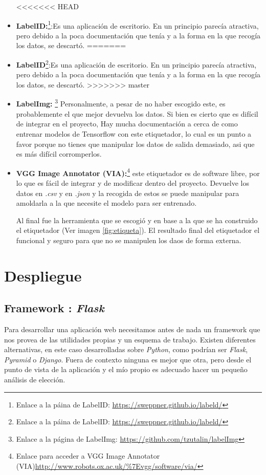 \begin{itemize}
<<<<<<< HEAD
	\item \textbf{LabelID:}\footnote{Enlace a la páina de LabelID: \url{https://sweppner.github.io/labeld/}}:Es una aplicación de escritorio. En un principio parecía atractiva, pero debido a la poca documentación que tenía y a la forma en la que recogía los datos, se descartó.
=======
	\item \textbf{LabelID}\footnote{Enlace a la páina de LabelID: \url{https://sweppner.github.io/labeld/}}:Es una aplicación de escritorio. En un principio parecía atractiva, pero debido a la poca documentación que tenía y a la forma en la que recogía los datos, se descartó.
>>>>>>> master

	\item \textbf{LabelImg:} \footnote{Enlace a la página de LabelImg:  \url{https://github.com/tzutalin/labelImg}} Personalmente, a pesar de no haber escogido este, es probablemente el que mejor devuelva los datos. Si bien es cierto que es difícil de integrar en el proyecto, Hay mucha documentación a cerca de como entrenar modelos de Tensorflow con este etiquetador, lo cual es un punto a favor porque no tienes que manipular los datos de salida demasiado, asi que es más difícil corromperlos.
	
	\item \textbf{VGG Image Annotator (VIA):}\footnote{Enlace para acceder a VGG Image Annotator (VIA)\url{http://www.robots.ox.ac.uk/\%7Evgg/software/via/}} este etiquetador es de software libre, por lo que es fácil de integrar y de modificar dentro del proyecto. Devuelve los datos en \textit{.csv} y en \textit{.json} y la recogida de estos se puede manipular para amoldarla a la que necesite el modelo para ser entrenado.
	
	Al final fue la herramienta que se escogió y en base a la que se ha construido el etiquetador (Ver imagen \ref{fig:etiqueta}). El resultado final del etiquetador el funcional y seguro para que no se manipulen los daos de forma externa.
	
\end{itemize}

\section{Despliegue}
\subsection{Framework : \textit{Flask}}
Para desarrollar una aplicación web necesitamos antes de nada un framework que nos provea de las utilidades propias y un esquema de trabajo. Existen diferentes alternativas, en este caso desarrolladas sobre \textit{Python}, como podrían ser \textit{Flask}, \textit{Pyramid} o \textit{Django}. Fuera de contexto ninguna es mejor que otra, pero desde el punto de vista de la aplicación y el mío propio es adecuado hacer un pequeño análisis de elección.

